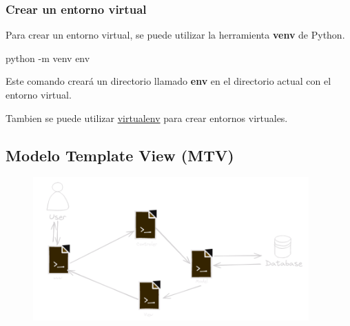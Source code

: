 \documentclass[
  a4paper,
  DIV=11,
  numbers=noendperiod,
  onepage,
  openany]{scrreprt}
\newenvironment{Shaded}{\begin{snugshade}}{\end{snugshade}}
\newcommand{\AttributeTok}[1]{\textcolor[rgb]{0.40,0.45,0.13}{#1}}
\newcommand{\ExtensionTok}[1]{\textcolor[rgb]{0.00,0.23,0.31}{#1}}
\newcommand{\NormalTok}[1]{\textcolor[rgb]{0.00,0.23,0.31}{#1}}
\begin{document}
\begin{tcolorbox}
\subsubsection{Crear un entorno virtual}\label{crear-un-entorno-virtual}

Para crear un entorno virtual, se puede utilizar la herramienta
\textbf{venv} de Python.

\begin{Shaded}
\begin{Highlighting}[]
\ExtensionTok{python} \AttributeTok{{-}m}\NormalTok{ venv env}
\end{Highlighting}
\end{Shaded}

Este comando creará un directorio llamado \textbf{env} en el directorio
actual con el entorno virtual.

\begin{tcolorbox}[enhanced jigsaw, bottomrule=.15mm, title=\textcolor{quarto-callout-tip-color}{\faLightbulb}\hspace{0.5em}{Tip}, coltitle=black, leftrule=.75mm, left=2mm, colbacktitle=quarto-callout-tip-color!10!white, breakable, colframe=quarto-callout-tip-color-frame, colback=white, opacitybacktitle=0.6, opacityback=0, bottomtitle=1mm, toptitle=1mm, toprule=.15mm, arc=.35mm, titlerule=0mm, rightrule=.15mm]

Tambien se puede utilizar
\href{https://pypi.org/project/virtualenv/}{virtualenv} para crear
entornos virtuales.

\end{tcolorbox}

\subsection{Modelo Template View (MTV)}\label{modelo-template-view-mtv}

\begin{figure}[H]

{\centering \includegraphics[width=4.16667in,height=\textheight]{images/model-view-controller.png}

}
\end{figure}
\end{tcolorbox}
\end{document}
